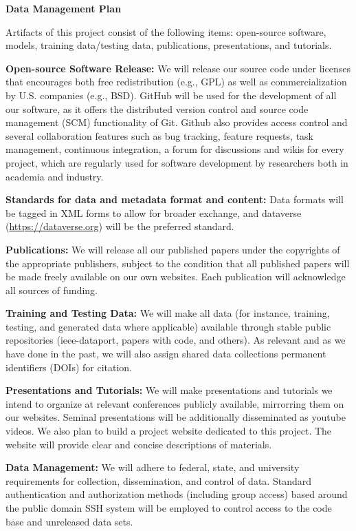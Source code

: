 \documentclass[11pt]{article}
\begin{document}
\newcommand{\alert}[1]{{\color{blue}{#1}}}


\begin{center}
{\Large \textbf{Data Management Plan}}
\end{center}


Artifacts of this project consist of the following items: open-source software, models, training data/testing data, publications, presentations, and tutorials. 

\textbf{Open-source Software Release:} We will release our source code under licenses that encourages both free redistribution (e.g., GPL) as well as commercialization by U.S. companies (e.g., BSD). GitHub will be used for the development of all our software, as it offers the distributed version control and source code management (SCM) functionality of Git. Github also provides access control and several collaboration features such as bug tracking, feature requests, task management, continuous integration, a forum for discussions and wikis for every project, which are regularly used for software development by researchers both in academia and industry.

\textbf{Standards for data and metadata format and content:} Data formats will be tagged in XML forms to allow for broader exchange, and dataverse (\url{https://dataverse.org}) will be the preferred standard.

\textbf{Publications:} We will release all our published papers under the copyrights of the appropriate publishers, subject to the condition that all published papers will be made freely available on our own websites. Each publication will acknowledge all sources of funding.

\textbf{Training and Testing Data:} We will make all data (for instance, training, testing, and generated data where applicable) available through stable public repositories (ieee-dataport, papers with code, and others). As relevant and as we have done in the past, we will also assign shared data collections permanent identifiers (DOIs) for citation.

\textbf{Presentations and Tutorials:} We will make presentations and tutorials we intend to organize at relevant conferences publicly available, mirrorring them on our websites. Seminal presentations will be additionally disseminated as youtube videos. We also plan to build a project website dedicated to this project. The website will provide clear and concise descriptions of materials.

\textbf{Data Management:} We will adhere to federal, state, and university requirements for collection, dissemination, and control of data. Standard authentication and authorization methods (including group access) based around the public domain SSH system will be employed to control access to the code base and unreleased data sets.
\end{document}
